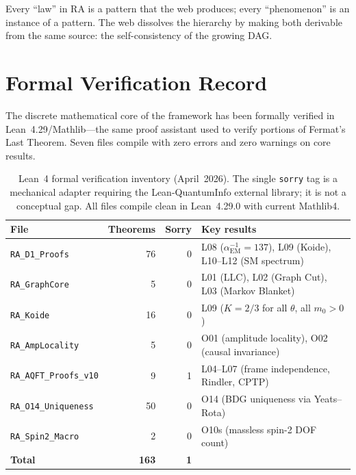 \documentclass[11pt,a4paper]{article}
\theoremstyle{plain}
\theoremstyle{definition}
\theoremstyle{remark}
\begin{document}
Every ``law'' in RA is a pattern that the web produces; every ``phenomenon'' is
an instance of a pattern.  The web dissolves the hierarchy by making both
derivable from the same source: the self-consistency of the growing DAG.

\section{Formal Verification Record}\label{sec:lean}

The discrete mathematical core of the framework has been formally verified in
Lean~4.29/Mathlib---the same proof assistant used to verify portions of Fermat's
Last Theorem.  Seven files compile with zero errors and zero warnings on core
results.

\begin{table}[ht]
\centering
\small
\begin{tabular}{@{}lrrl@{}}
\toprule
File & Theorems & Sorry & Key results \\
\midrule
\texttt{RA\_D1\_Proofs}       & 76 & 0 & L08 ($\alpha_{\mathrm{EM}}^{-1}=137$), L09 (Koide), L10--L12 (SM spectrum) \\
\texttt{RA\_GraphCore}         &  5 & 0 & L01 (LLC), L02 (Graph Cut), L03 (Markov Blanket) \\
\texttt{RA\_Koide}             & 16 & 0 & L09 ($K = 2/3$ for all $\theta$, all $m_0 > 0$) \\
\texttt{RA\_AmpLocality}       &  5 & 0 & O01 (amplitude locality), O02 (causal invariance) \\
\texttt{RA\_AQFT\_Proofs\_v10} &  9 & 1 & L04--L07 (frame independence, Rindler, CPTP) \\
\texttt{RA\_O14\_Uniqueness}   & 50 & 0 & O14 (BDG uniqueness via Yeats--Rota) \\
\texttt{RA\_Spin2\_Macro}      &  2 & 0 & O10s (massless spin-2 DOF count) \\
\midrule
\textbf{Total} & \textbf{163} & \textbf{1} & \\
\bottomrule
\end{tabular}
\caption{Lean~4 formal verification inventory (April~2026).  The single
\texttt{sorry} tag is a mechanical adapter requiring the Lean-QuantumInfo
external library; it is not a conceptual gap.  All files compile clean in
Lean~4.29.0 with current Mathlib4.}
\label{tab:lean}
\end{table}
\end{document}
